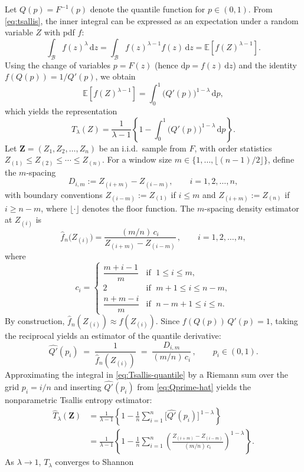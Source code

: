 \documentclass[
  lettersize  journal,
]{IEEEtran}%
\begin{document}
Let \(Q(p)=F^{-1}(p)\) denote the quantile function for \(p\in(0,1)\).
From \eqref{eq:tsallis}, the inner integral can be expressed as an
expectation under a random variable \(Z\) with pdf \(f\): \[
\int_{\mathcal B} f(z)^\lambda\,\mathrm{d}z
=\int_{\mathcal B} f(z)^{\lambda-1} f(z)\,\mathrm{d}z
=\mathbb{E}\!\left[f(Z)^{\lambda-1}\right].
\] Using the change of variables \(p=F(z)\) (hence
\(\mathrm{d}p=f(z)\,\mathrm{d}z\)) and the identity \(f(Q(p))=1/Q'(p)\),
we obtain \[
  \mathbb{E}\!\left[f(Z)^{\lambda-1}\right]
  = \int_{0}^{1} \bigl(Q'(p)\bigr)^{1-\lambda}\,\mathrm{d}p,
\] which yields the representation \begin{equation}
  T_\lambda(Z)
  =\frac{1}{\lambda-1}
     \left\{
       1-\int_{0}^{1}\bigl(Q'(p)\bigr)^{1-\lambda}\,\mathrm{d}p
     \right\}.
  \label{eq:Tsallis-quantile}
\end{equation} Let \(\bm{Z}=(Z_1,Z_2,\dots,Z_n)\) be an i.i.d.~sample
from \(F\), with order statistics
\(Z_{(1)}\le Z_{(2)} \le \cdots\le Z_{(n)}\). For a window size
\(m\in\{1,\dots,\lfloor (n-1)/2\rfloor\}\), define the \(m\)-spacing \[
D_{i,m}:=Z_{(i+m)}-Z_{(i-m)},\qquad i=1,2,\dots,n,
\] with boundary conventions \(Z_{(i-m)}:=Z_{(1)}\) if \(i\le m\) and
\(Z_{(i+m)}:=Z_{(n)}\) if \(i\ge n-m\), where \(\lfloor \cdot \rfloor\)
denotes the floor function. The \(m\)-spacing density estimator at
\(Z_{(i)}\) is \begin{equation}
\widehat f_n\bigl(Z_{(i)}\bigr)
=\frac{(m/n) \, c_i}{Z_{(i+m)}-Z_{(i-m)}}\,,\qquad i=1,2,\dots,n,
\label{eq:density-spacing}
\end{equation} where \[
c_i=
\begin{cases}
\dfrac{m+i-1}{m} & \text{if } \; 1\le i\le m,\\[6pt]
2 & \text{if } \; m+1\le i\le n-m,\\[6pt]
\dfrac{n+m-i}{m} & \text{if } \; n-m+1\le i\le n.
\end{cases}
\] By construction, \(\widehat f_n(Z_{(i)})\approx f(Z_{(i)})\). Since
\(f(Q(p))\,Q'(p)=1\), taking the reciprocal yields an estimator of the
quantile derivative: \begin{equation}
\widehat{Q'}(p_i)
\;=\; \frac{1}{\widehat f_n(Z_{(i)})}
\;=\; \frac{D_{i,m}}{(m/n)\, c_i}\,,
\qquad p_i \in (0,1).
\label{eq:Qprime-hat}
\end{equation} Approximating the integral in \eqref{eq:Tsallis-quantile}
by a Riemann sum over the grid \(p_i=i/n\) and inserting
\(\widehat{Q'}(p_i)\) from \eqref{eq:Qprime-hat} yields the
nonparametric Tsallis entropy estimator: \begin{align}
  \widehat T_{\lambda}(\bm{Z})
  &=\frac{1}{\lambda-1}\left\{
1-\frac{1}{n}\sum_{i=1}^{n}\bigl[\widehat{Q'}(p_i)\bigr]^{\,1-\lambda}
\right\} \nonumber\\[4pt]
  &= \frac{1}{\lambda-1}
  \left\{
    1-\frac{1}{n}
       \sum_{i=1}^{n}
       \left(
         \frac{Z_{(i+m)}-Z_{(i-m)}}{(m/n) \, c_i}
       \right)^{1-\lambda}
  \right\}.
  \label{eq:Tsallis-spacing-estimator}
\end{align} As \(\lambda\to 1\), \(T_\lambda\) converges to Shannon
\end{document}

